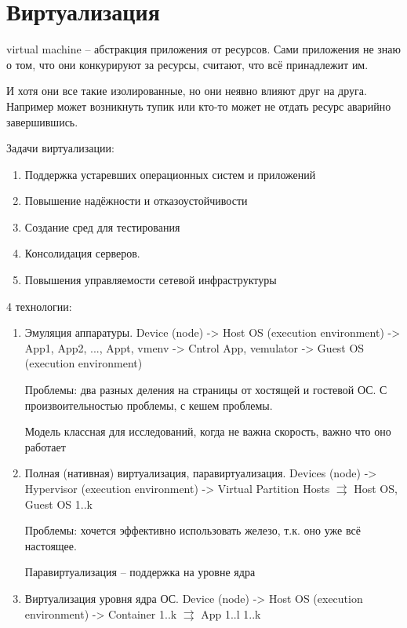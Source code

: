 \documentclass{book}
\theoremstyle{definition}
\begin{document}
\section{Виртуализация}

virtual machine -- абстракция приложения от ресурсов. Сами приложения не знаю о том, что они конкурируют за ресурсы, считают, что всё принадлежит им.

И хотя они все такие изолированные, но они неявно влияют друг на друга. Например может возникнуть тупик или кто-то может не отдать ресурс аварийно завершившись.

Задачи виртуализации:
\begin{enumerate}
    \item Поддержка устаревших операционных систем и приложений
    \item Повышение надёжности и отказоустойчивости 
    \item Создание сред для тестирования
    \item Консолидация серверов.
    \item Повышения управляемости сетевой инфраструктуры
\end{enumerate}

4 технологии:
\begin{enumerate}
    \item Эмуляция аппаратуры. Device (node) -> Host OS (execution environment) -> App1, App2, ..., Appt, vmenv -> Cntrol App, vemulator -> Guest OS (execution environment)

        Проблемы: два разных деления на страницы от хостящей и гостевой ОС. С произвоительностью проблемы, с кешем проблемы.

        Модель классная для исследований, когда не важна скорость, важно что оно работает
    \item Полная (нативная) виртуализация, паравиртуализация. Devices (node) -> Hypervisor (execution environment) -> Virtual Partition Hosts $\rightrightarrows$ Host OS, Guest OS 1..k

        Проблемы: хочется эффективно использовать железо, т.к. оно уже всё настоящее.

        Паравиртуализация -- поддержка на уровне ядра 
    \item Виртуализация уровня ядра ОС. Device (node) -> Host OS (execution environment) -> Container 1..k $\rightrightarrows$ App 1..l 1..k
\end{enumerate}
\end{document}
